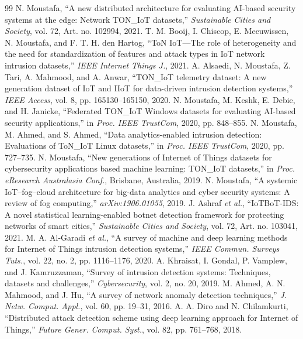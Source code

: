 \documentclass[conference]{IEEEtran}
\begin{document}
\begin{thebibliography}{99}\footnotesize
{} N. Moustafa, ``A new distributed architecture for evaluating AI-based security systems at the edge: Network TON\_IoT datasets,'' \textit{Sustainable Cities and Society}, vol. 72, Art. no. 102994, 2021.
 T. M. Booij, I. Chiscop, E. Meeuwissen, N. Moustafa, and F. T. H. den Hartog, ``ToN IoT---The role of heterogeneity and the need for standardization of features and attack types in IoT network intrusion datasets,'' \textit{IEEE Internet Things J.}, 2021.
 A. Alsaedi, N. Moustafa, Z. Tari, A. Mahmood, and A. Anwar, ``TON\_IoT telemetry dataset: A new generation dataset of IoT and IIoT for data-driven intrusion detection systems,'' \textit{IEEE Access}, vol. 8, pp. 165130--165150, 2020.
 N. Moustafa, M. Keshk, E. Debie, and H. Janicke, ``Federated TON\_IoT Windows datasets for evaluating AI-based security applications,'' in \textit{Proc. IEEE TrustCom}, 2020, pp. 848--855.
 N. Moustafa, M. Ahmed, and S. Ahmed, ``Data analytics-enabled intrusion detection: Evaluations of ToN\_IoT Linux datasets,'' in \textit{Proc. IEEE TrustCom}, 2020, pp. 727--735.
 N. Moustafa, ``New generations of Internet of Things datasets for cybersecurity applications based machine learning: TON\_IoT datasets,'' in \textit{Proc. eResearch Australasia Conf.}, Brisbane, Australia, 2019.
 N. Moustafa, ``A systemic IoT--fog--cloud architecture for big-data analytics and cyber security systems: A review of fog computing,'' \textit{arXiv:1906.01055}, 2019.
 J. Ashraf \textit{et al.}, ``IoTBoT-IDS: A novel statistical learning-enabled botnet detection framework for protecting networks of smart cities,'' \textit{Sustainable Cities and Society}, vol. 72, Art. no. 103041, 2021.
 M. A. Al-Garadi \textit{et al.}, ``A survey of machine and deep learning methods for Internet of Things intrusion detection systems,'' \textit{IEEE Commun. Surveys Tuts.}, vol. 22, no. 2, pp. 1116--1176, 2020.
 A. Khraisat, I. Gondal, P. Vamplew, and J. Kamruzzaman, ``Survey of intrusion detection systems: Techniques, datasets and challenges,'' \textit{Cybersecurity}, vol. 2, no. 20, 2019.
 M. Ahmed, A. N. Mahmood, and J. Hu, ``A survey of network anomaly detection techniques,'' \textit{J. Netw. Comput. Appl.}, vol. 60, pp. 19--31, 2016.
 A. A. Diro and N. Chilamkurti, ``Distributed attack detection scheme using deep learning approach for Internet of Things,'' \textit{Future Gener. Comput. Syst.}, vol. 82, pp. 761--768, 2018.

\end{thebibliography}
\end{document}
